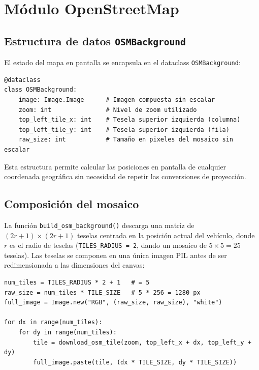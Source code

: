 \documentclass[10pt]{article}
\begin{document}
\section{Módulo OpenStreetMap}

\subsection{Estructura de datos \texttt{OSMBackground}}

El estado del mapa en pantalla se encapsula en el dataclass \texttt{OSMBackground}:

\begin{lstlisting}[style=pythonEstilo]
@dataclass
class OSMBackground:
    image: Image.Image      # Imagen compuesta sin escalar
    zoom: int               # Nivel de zoom utilizado
    top_left_tile_x: int    # Tesela superior izquierda (columna)
    top_left_tile_y: int    # Tesela superior izquierda (fila)
    raw_size: int           # Tamaño en pixeles del mosaico sin escalar
\end{lstlisting}

Esta estructura permite calcular las posiciones en pantalla de cualquier coordenada geográfica sin necesidad de repetir las conversiones de proyección.

\subsection{Composición del mosaico}

La función \texttt{build\_osm\_background()} descarga una matriz de $(2r+1) \times (2r+1)$ teselas centrada en la posición actual del vehículo, donde $r$ es el radio de teselas (\texttt{TILES\_RADIUS = 2}, dando un mosaico de $5 \times 5 = 25$ teselas). Las teselas se componen en una única imagen PIL antes de ser redimensionada a las dimensiones del canvas:

\begin{lstlisting}[style=pythonEstilo]
num_tiles = TILES_RADIUS * 2 + 1   # = 5
raw_size = num_tiles * TILE_SIZE   # 5 * 256 = 1280 px
full_image = Image.new("RGB", (raw_size, raw_size), "white")

for dx in range(num_tiles):
    for dy in range(num_tiles):
        tile = download_osm_tile(zoom, top_left_x + dx, top_left_y + dy)
        full_image.paste(tile, (dx * TILE_SIZE, dy * TILE_SIZE))
\end{lstlisting}
\end{document}
